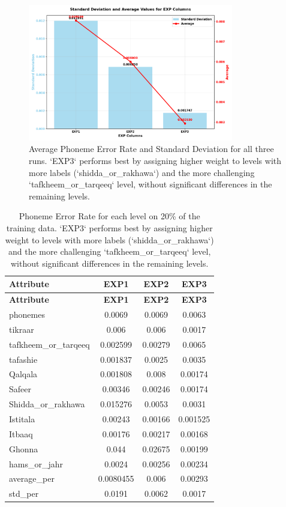 \begin{figure}[H]
\centering
\includegraphics[width=0.8\textwidth]{./figures/results_stats_v2.png}
\caption{Average Phoneme Error Rate and Standard Deviation for all three runs. `EXP3` performs best by assigning higher weight to levels with more labels (`shidda_or_rakhawa`) and the more challenging `tafkheem_or_tarqeeq` level, without significant differences in the remaining levels.}
\label{fig:results_v2_std}
\end{figure}

\begin{longtable}{|l|c|c|c|}
\caption{Phoneme Error Rate for each level on 20\% of the training data. `EXP3` performs best by assigning higher weight to levels with more labels (`shidda_or_rakhawa`) and the more challenging `tafkheem_or_tarqeeq` level, without significant differences in the remaining levels.}
\label{tab:results_v2}\\
\hline
\textbf{Attribute} & \textbf{EXP1} & \textbf{EXP2} & \textbf{EXP3} \\ 
\hline
\endfirsthead
\hline
\textbf{Attribute} & \textbf{EXP1} & \textbf{EXP2} & \textbf{EXP3} \\
\hline
\endhead
\hline
phonemes & 0.0069 & 0.0069 & 0.0063 \\
\hline
tikraar & 0.006 & 0.006 & 0.0017 \\
\hline
tafkheem_or_tarqeeq & 0.002599 & 0.00279 & 0.0065 \\
\hline
tafashie & 0.001837 & 0.0025 & 0.0035 \\
\hline
Qalqala & 0.001808 & 0.008 & 0.00174 \\
\hline
Safeer & 0.00346 & 0.00246 & 0.00174 \\
\hline
Shidda_or_rakhawa & 0.015276 & 0.0053 & 0.0031 \\
\hline
Istitala & 0.00243 & 0.00166 & 0.001525 \\
\hline
Itbaaq & 0.00176 & 0.00217 & 0.00168 \\
\hline
Ghonna & 0.044 & 0.02675 & 0.00199 \\
\hline
hams_or_jahr & 0.0024 & 0.00256 & 0.00234 \\
\hline
average_per & 0.0080455 & 0.006 & 0.00293 \\
\hline
std_per & 0.0191 & 0.0062 & 0.0017 \\
\hline
\end{longtable}

